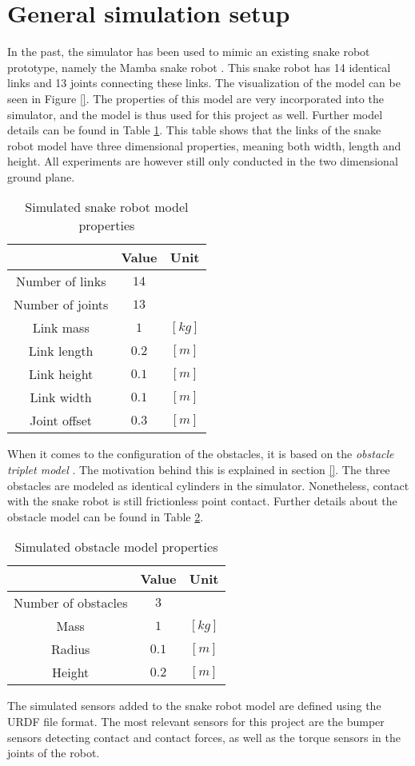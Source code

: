 \section{General simulation setup}\label{sec:simsetup}

In the past, the simulator has been used to mimic an existing snake robot prototype, namely the Mamba snake robot \cite{liljeback2014mamba}. This snake robot has 14 identical links and 13 joints connecting these links. The visualization of the model can be seen in Figure \ref{}. The properties of this model are very incorporated into the simulator, and the model is thus used for this project as well. Further model details can be found in Table \ref{tab:snake_model_props}. This table shows that the links of the snake robot model have three dimensional properties, meaning both width, length and height. All experiments are however still only conducted in the two dimensional ground plane.

\begin{table}[]
    \centering
    \begin{tabular}{|c|c|c|}
        \hline
        & Value & Unit\\
        \hline
        Number of links & $14$ & \\
        Number of joints & $13$ & \\
        Link mass & $1$ & $[kg]$ \\
        Link length & $0.2$ & $[m]$ \\
        Link height & $0.1$ & $[m]$ \\
        Link width & $0.1$ & $[m]$ \\
        Joint offset & $0.3$ & $[m]$\\
        \hline
    \end{tabular}
    \caption{Simulated snake robot model properties}
    \label{tab:snake_model_props}
\end{table}

When it comes to the configuration of the obstacles, it is based on the \textit{obstacle triplet model} \cite{sanfilippo2018snakesim}. The motivation behind this is explained in section \ref{}. The three obstacles are modeled as identical cylinders in the simulator. Nonetheless, contact with the snake robot is still frictionless point contact. Further details about the obstacle model can be found in Table \ref{tab:obst_model_props}.

\begin{table}[]
    \centering
    \begin{tabular}{|c|c|c|}
        \hline
        & Value & Unit\\
        \hline
        Number of obstacles & $3$ & \\
        Mass & $1$ & $[kg]$ \\
        Radius & $0.1$ & $[m]$ \\
        Height & $0.2$ & $[m]$ \\
        \hline
    \end{tabular}
    \caption{Simulated obstacle model properties}
    \label{tab:obst_model_props}
\end{table}

The simulated sensors added to the snake robot model are defined using the URDF \cite{} file format. The most relevant sensors for this project are the bumper sensors \cite{} detecting contact and contact forces, as well as the torque sensors in the joints of the robot.
